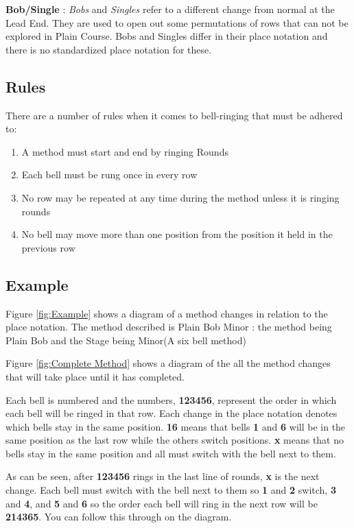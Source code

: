 \documentclass{l4proj}
\begin{document}
\textbf{Bob/Single} : \textit{Bobs} and \textit{Singles} refer to a different change from normal at the Lead End. They are used to open out some permutations of rows that can not be explored in Plain Course. Bobs and Singles differ in their place notation and there is no standardized place notation for these.

\subsection{Rules}

There are a number of rules when it comes to bell-ringing that must be adhered to:
\begin{enumerate}
\item A method must start and end by ringing Rounds
\item Each bell must be rung once in every row
\item No row may be repeated at any time during the method unless it is ringing rounds
\item No bell may move more than one position from the position it held in the previous row
\end{enumerate}

\subsection{Example}
Figure \ref{fig:Example} shows a diagram of a method changes in relation to the place notation. The method described is Plain Bob Minor : the method being Plain Bob and the Stage being Minor(A six bell method) 

Figure \ref{fig:Complete Method} shows a diagram of the all the method changes that will take place until it has completed.

Each bell is numbered and the numbers, \textbf{123456}, represent the order in which each bell will be ringed in that row.  Each change in the place notation denotes which bells stay in the same position. \textbf{16} means that bells \textbf{1} and \textbf{6} will be in the same position as the last row while the others switch positions. \textbf{x} means that no bells stay in the same position and all must switch with the bell next to them.

As can be seen, after \textbf{123456} rings in the last line of rounds, \textbf{x} is the next change.  Each bell must switch with the bell next to them so \textbf{1} and \textbf{2} switch, \textbf{3} and \textbf{4}, and \textbf{5} and \textbf{6} so the order each bell will ring in the next row will be \textbf{214365}.  You can follow this through on the diagram. 
\end{document}
